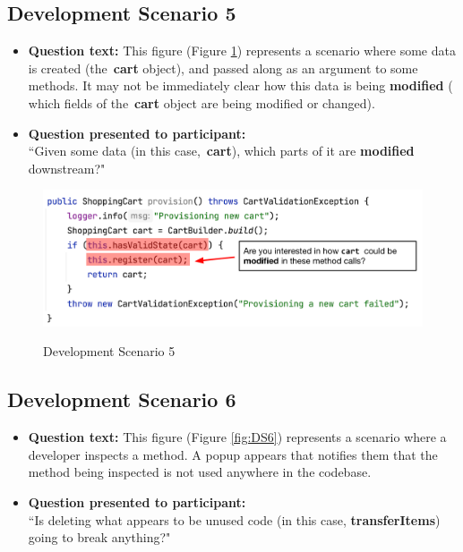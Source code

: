 \subsection{Development Scenario 5}

\begin{itemize}
  \item[] \textbf{Question text:} This figure (Figure \ref{fig:DS5}) represents 
          a scenario where some data is created (the \textbf{cart} object), and
          passed along as an argument to some methods. It may not be 
          immediately clear how this data is being \textbf{modified} (\eg 
          which fields of the \textbf{cart} object are being modified or changed).
  \item[] \textbf{Question presented to participant:}  \\
          ``Given some data (in this case, \textbf{cart}), which parts of it
          are \textbf{modified} downstream?"
\end{itemize}

\begin{figure}[ht]
\centering
\caption{Development Scenario 5}
\includegraphics[width=\textwidth]{./figs/ds5.png}
\label{fig:DS5}
\end{figure}

\subsection{Development Scenario 6}

\begin{itemize}
  \item[] \textbf{Question text:} This figure (Figure \ref{fig:DS6}) represents 
          a scenario where a developer inspects a method. A popup appears that 
          notifies them that the method being inspected is not used anywhere in 
          the codebase.
  \item[] \textbf{Question presented to participant:}  \\
         ``Is deleting what appears to be unused code (in this case, 
         \textbf{transferItems}) going to break anything?"
\end{itemize}

